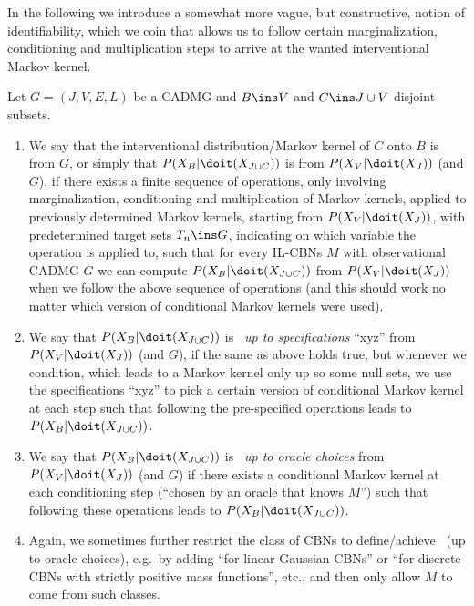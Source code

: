 In the following we introduce a somewhat more vague, but constructive, notion of identifiability, which we coin \emph{\trackability} that allows us to follow certain marginalization, conditioning and multiplication steps to arrive at the wanted interventional Markov kernel.

\begin{Def}
    Let $G=(J,V,E,L)$ be a CADMG and $B \ins V$ and $C \ins J \cup V$ disjoint subsets.
    \begin{enumerate}
        \item We say that the interventional distribution/Markov kernel of $C$ onto $B$ is \emph{\trackable} from $G$,
            or simply that $P(X_B|\doit(X_{J \cup C}))$ is \emph{\trackable} from $P(X_V|\doit(X_J))$ (and $G$),
    if there exists a finite sequence of operations, only involving marginalization, conditioning and multiplication of Markov kernels,
    applied to previously determined Markov kernels, starting from $P(X_V|\doit(X_J))$, with predetermined target sets $T_n \ins G$,
    indicating on which variable the operation is applied to, such that for every IL-CBNs $M$ with observational CADMG $G$ 
    we can compute $P(X_B|\doit(X_{J \cup C}))$ from $P(X_V|\doit(X_J))$ when we follow the above sequence of operations (and this should work no matter which version of conditional Markov kernels were used).
\item We say that $P(X_B|\doit(X_{J \cup C}))$ is \emph{\trackable\ up to specifications} ``xyz'' from $P(X_V|\doit(X_J))$ (and $G$), if the same as above holds true, but whenever we condition,  which leads to a Markov kernel only up so some null sets, we use the specifications ``xyz'' to pick a certain version of conditional Markov kernel at each step such that following the pre-specified operations leads to $P(X_B|\doit(X_{J \cup C}))$. 
\item We say that $P(X_B|\doit(X_{J \cup C}))$ is \emph{\trackable\ up to oracle choices} from $P(X_V|\doit(X_J))$ (and $G$) if there exists a conditional Markov kernel at each conditioning step (``chosen by an oracle that knows $M$'') 
    such that following these operations leads to $P(X_B|\doit(X_{J \cup C}))$. 
\item    Again, we sometimes further restrict the class of CBNs to define/achieve \trackability\ (up to oracle choices), 
    e.g.\ by adding ``for linear Gaussian CBNs'' or ``for discrete CBNs with strictly positive mass functions'', etc., 
    and then only allow $M$ to come from such classes.
    \end{enumerate}
\end{Def}


